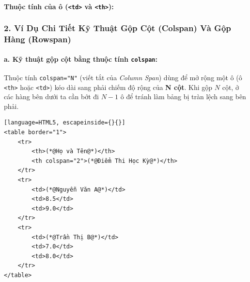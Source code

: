 \documentclass[11pt,oneside]{book}
\newcommand{\thd}[1]{\textcolor{white}{\textbf{\strut #1}}}
\newcommand{\codeinline}[1]{\textcolor{accentOrange}{\texttt{#1}}}
\begin{document}
\paragraph{Thuộc tính của ô (\codeinline{<td>} và \codeinline{<th>}):}
\begin{prettyTableBox}
\end{prettyTableBox}

\subsubsection{2. Ví Dụ Chi Tiết Kỹ Thuật Gộp Cột (Colspan) Và Gộp Hàng (Rowspan)}

\paragraph{a. Kỹ thuật gộp cột bằng thuộc tính \codeinline{colspan}:}

Thuộc tính \codeinline{colspan="N"} (viết tắt của \textit{Column Span}) dùng để mở rộng một ô (ô \codeinline{<th>} hoặc \codeinline{<td>}) kéo dài sang phải chiếm độ rộng của \textbf{N cột}. Khi gộp $N$ cột, ở các hàng bên dưới ta cần bớt đi $N-1$ ô để tránh làm bảng bị tràn lệch sang bên phải.

\begin{codeWindow}
\begin{lstlisting}[language=HTML5, escapeinside={}{}]
<table border="1">
    <tr>
        <th>(*@Họ và Tên@*)</th>
        <th colspan="2">(*@Điểm Thi Học Kỳ@*)</th>
    </tr>
    <tr>
        <td>(*@Nguyễn Văn A@*)</td>
        <td>8.5</td>
        <td>9.0</td>
    </tr>
    <tr>
        <td>(*@Trần Thị B@*)</td>
        <td>7.0</td>
        <td>8.0</td>
    </tr>
</table>
\end{lstlisting}
\end{codeWindow}
\end{document}
